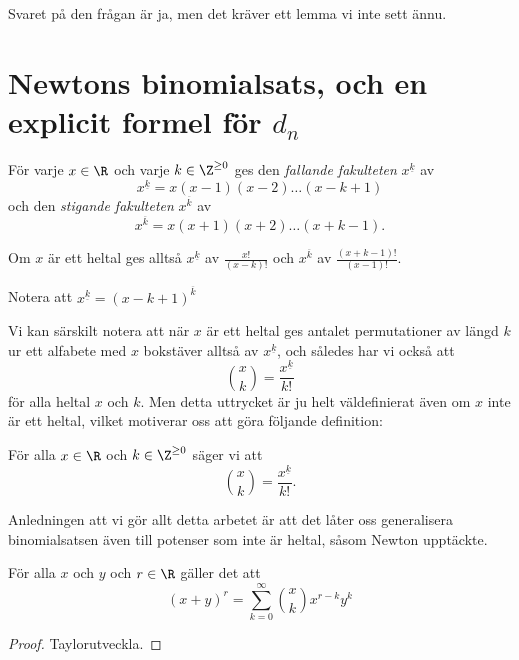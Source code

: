 \documentclass{tufte-handout}
\begin{document}
Svaret på den frågan är ja, men det kräver ett lemma vi inte sett ännu.

\section{Newtons binomialsats, och en explicit formel för $d_n$}

\begin{definition}
    För varje $x\in \R$ och varje $k \in \Z^{\geq 0}$ ges den \emph{fallande fakulteten} $x^{\underline{k}}$ av
    $$x^{\underline{k}} = x(x-1)(x-2)\ldots(x-k+1)$$
    och den \emph{stigande fakulteten} $x^{\overline{k}}$ av
    $$x^{\overline{k}} = x(x+1)(x+2)\ldots(x+k-1).$$

    Om $x$ är ett heltal ges alltså $x^{\underline{k}}$ av $\frac{x!}{(x-k)!}$ och $x^{\overline{k}}$ av $\frac{(x+k-1)!}{(x-1)!}$.\par
    \vspace{.2cm}
    Notera att $x^{\underline{k}} = (x-k+1)^{\overline{k}}$
\end{definition}

Vi kan särskilt notera att när $x$ är ett heltal ges antalet permutationer av längd $k$ ur ett alfabete med $x$ bokstäver alltså av $x^{\underline{k}}$, och således har vi också att
$$\binom{x}{k} = \frac{x^{\underline{k}}}{k!}$$
för alla heltal $x$ och $k$. Men detta uttrycket är ju helt väldefinierat även om $x$ inte är ett heltal, vilket motiverar oss att göra följande definition:

\begin{definition}
    För alla $x \in \R$ och $k \in \Z^{\geq 0}$ säger vi att
    $$\binom{x}{k} = \frac{x^{\underline{k}}}{k!}.$$
\end{definition}

Anledningen att vi gör allt detta arbetet är att det låter oss generalisera binomialsatsen även till potenser som inte är heltal, såsom Newton upptäckte.

\begin{theorem}
    För alla $x$ och $y$ och $r \in \R$ gäller det att
    $$(x + y)^r = \sum_{k=0}^{\infty} \binom{x}{k} x^{r-k} y^k$$

    \begin{proof}
        Taylorutveckla.
    \end{proof}
\end{theorem}
\end{document}
